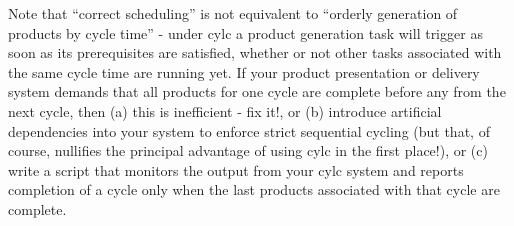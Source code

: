\documentclass[11pt,a4paper]{article}
\begin{document}
Note that ``correct scheduling'' is not equivalent to ``orderly
generation of products by cycle time'' - under cylc a product
generation task will trigger as soon as its prerequisites are satisfied,
whether or not other tasks associated with the same cycle time are
running yet. If your product presentation or delivery system demands
that all products for one cycle are complete before any from the next
cycle, then (a) this is inefficient - fix it!, or (b) introduce artificial
dependencies into your system to enforce strict sequential cycling (but
that, of course, nullifies the principal advantage of using cylc in the
first place!), or (c) write a script that monitors the output from 
your cylc system and reports completion of a cycle only when the last
products associated with that cycle are complete. 

%
\end{document}
